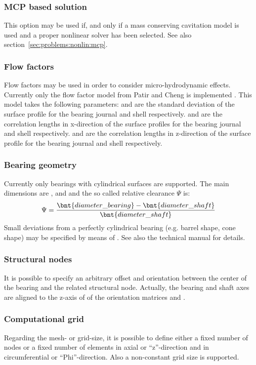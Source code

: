 \subsubsection{MCP based solution}
This option may be used if, and only if a mass conserving cavitation model is used and a proper nonlinear solver has been selected. See also section~\ref{sec:problems:nonlin:mcp}.
\subsubsection{Flow factors}
Flow factors may be used in order to consider micro-hydrodynamic effects. Currently only the flow factor model from Patir and Cheng is implemented \cite{PatirCheng1978}. This model takes the following parameters:  and  are the standard deviation of the surface profile for the bearing journal and shell respectively.  and  are the correlation lengths in x-direction of the surface profiles for the bearing journal and shell respectively.  and  are the correlation lengths in z-direction of the surface profile for the bearing journal and shell respectively.
\subsubsection{Bearing geometry}
Currently only bearings with cylindrical surfaces are supported. The main dimensions are ,  and  and the so called relative clearance $\Psi$ is:
\begin{equation}
\Psi=\frac{\bnt{diameter\_bearing} - \bnt{diameter\_shaft}}{\bnt{diameter\_shaft}}
\end{equation}
Small deviations from a perfectly cylindrical bearing (e.g. barrel shape, cone shape) may be specified by means of . See also the technical manual for details.
\subsubsection{Structural nodes}
It is possible to specify an arbitrary offset and orientation between the center of the bearing and the related structural node. Actually, the bearing and shaft axes are aligned to the z-axis of of the orientation matrices  and .
\subsubsection{Computational grid}
Regarding the mesh- or grid-size, it is possible to define either a fixed number of nodes or a fixed number of elements in axial or ``z''-direction and in circumferential or ``Phi''-direction. Also a non-constant grid size is supported.
